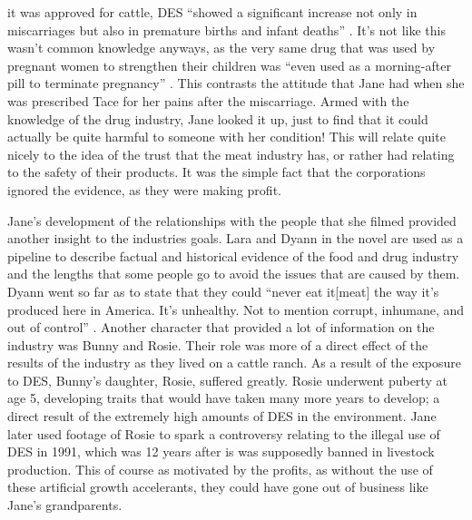 \documentclass{article}
\begin{document}
it was approved for cattle, DES ``showed a significant increase not only in
miscarriages but also in premature births and infant deaths''
\cite[Ch. 6]{ozeki1998my}. It's not like this wasn't common knowledge anyways, as
the very same drug that was used by pregnant women to strengthen their
children was ``even used as a morning-after pill to terminate pregnancy''
\cite[Ch. 6]{ozeki1998my}. This contrasts the attitude that Jane had when she was
prescribed Tace for her pains after the miscarriage. Armed with the
knowledge of the drug industry, Jane looked it up, just to find that it
could actually be quite harmful to someone with her condition! This will
relate quite nicely to the idea of the trust that the meat industry has, or
rather had relating to the safety of their products. It was the simple fact
that the corporations ignored the evidence, as they were making profit.

Jane's development of the relationships with the people that she filmed
provided another insight to the industries goals. Lara and Dyann in the
novel are used as a pipeline to describe factual and historical evidence of
the food and drug industry and the lengths that some people go to avoid the
issues that are caused by them. Dyann went so far as to state that they
could ``never eat it[meat] the way it’s produced here in America. It’s
unhealthy. Not to mention corrupt, inhumane, and out of control''
\cite[Ch. 8]{ozeki1998my}. Another character that provided a lot of information on
the industry was Bunny and Rosie. Their role was more of a direct effect of
the results of the industry as they lived on a cattle ranch. As a result of
the exposure to DES, Bunny's daughter, Rosie, suffered greatly. Rosie
underwent puberty at age 5, developing traits that would have taken many
more years to develop; a direct result of the extremely high
amounts of DES in the environment. Jane later used footage of Rosie to spark
a controversy relating to the illegal use of DES in 1991, which was 12 years
after is was supposedly banned in livestock production. This of course as
motivated by the profits, as without the use of these artificial growth
accelerants, they could have gone out of business like Jane's grandparents.
\end{document}
